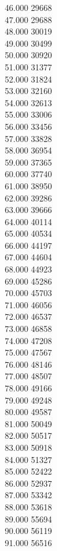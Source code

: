 { 46.000	29668 \\
 47.000	29688 \\
 48.000	30019 \\
 49.000	30499 \\
 50.000	30920 \\
 51.000	31377 \\
 52.000	31824 \\
 53.000	32160 \\
 54.000	32613 \\
 55.000	33006 \\
 56.000	33456 \\
 57.000	33828 \\
 58.000	36954 \\
 59.000	37365 \\
 60.000	37740 \\
 61.000	38950 \\
 62.000	39286 \\
 63.000	39666 \\
 64.000	40114 \\
 65.000	40534 \\
 66.000	44197 \\
 67.000	44604 \\
 68.000	44923 \\
 69.000	45286 \\
 70.000	45703 \\
 71.000	46056 \\
 72.000	46537 \\
 73.000	46858 \\
 74.000	47208 \\
 75.000	47567 \\
 76.000	48146 \\
 77.000	48507 \\
 78.000	49166 \\
 79.000	49248 \\
 80.000	49587 \\
 81.000	50049 \\
 82.000	50517 \\
 83.000	50918 \\
 84.000	51327 \\
 85.000	52422 \\
 86.000	52937 \\
 87.000	53342 \\
 88.000	53618 \\
 89.000	55694 \\
 90.000	56119 \\
 91.000	56516 \\
}

